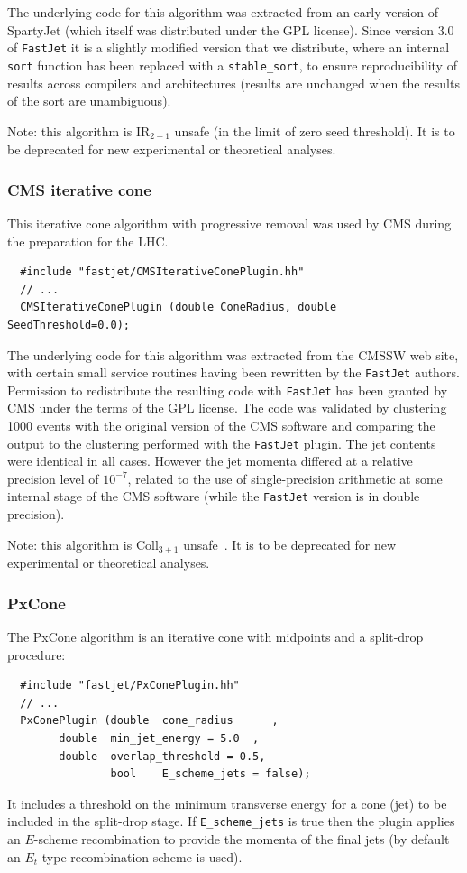 \documentclass[12pt,a4]{article}
\newcommand{\fastjet}{\texttt{FastJet}\xspace}
\newcommand{\ttt}[1]{{\small\texttt{#1}}}
\begin{document}
The underlying code for this algorithm was extracted from an early
version of SpartyJet \cite{SpartyJet} (which itself was distributed
under the GPL license).
%
Since version 3.0 of \fastjet it is a slightly modified version that
we distribute, where an internal \ttt{sort} function has been replaced
with a \ttt{stable\_sort}, to ensure reproducibility of results across
compilers and architectures (results are unchanged when the results of
the sort are unambiguous).

Note: this algorithm is IR$_{2+1}$ unsafe (in the limit of zero seed
threshold). It is to be deprecated for new experimental or theoretical
analyses.

\subsubsection{CMS iterative cone}
%
This iterative cone algorithm with progressive removal was used by CMS
during the preparation for the LHC.
\begin{lstlisting}
  #include "fastjet/CMSIterativeConePlugin.hh"
  // ...
  CMSIterativeConePlugin (double ConeRadius, double SeedThreshold=0.0);
\end{lstlisting}


The underlying code for this algorithm was extracted from the CMSSW
web site, with certain small service routines having been rewritten by
the \fastjet authors. 
%
Permission to redistribute the resulting code with \fastjet has been
granted by CMS under the terms of the GPL license.
%
The code was validated by clustering 1000 events with the original
version of the CMS software and comparing the output to the clustering
performed with the \fastjet plugin.
%
The jet contents were identical in all cases. However the jet momenta
differed at a relative precision level of $10^{-7}$, related to the
use of single-precision arithmetic at some internal stage of the CMS
software (while the \fastjet version is in double precision).


Note: this algorithm is Coll$_{3+1}$ unsafe~\cite{antikt}. It is to be
deprecated for new experimental or theoretical analyses.



\subsubsection{PxCone}

The PxCone algorithm is an iterative cone with midpoints and a
split-drop procedure:
\begin{lstlisting}
  #include "fastjet/PxConePlugin.hh"
  // ...
  PxConePlugin (double  cone_radius      , 
		double  min_jet_energy = 5.0  , 
		double  overlap_threshold = 0.5,
                bool    E_scheme_jets = false); 
\end{lstlisting}
It includes a threshold on the minimum transverse energy for a cone
(jet) to be included in the split-drop stage.
%
If \verb|E_scheme_jets| is true then the plugin applies an $E$-scheme
recombination to provide the momenta of the final jets (by default an
$E_t$ type recombination scheme is used).
\end{document}

